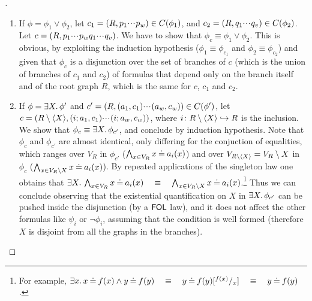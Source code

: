 \begin{proof}[]
\begin{enumerate}
\item 
If $\phi = \phi_1 \lor \phi_2$, let $c_1 = (R,p_1{\cdotp\mkern-2mu\cdotp\mkern-2mu\cdotp\mkern1mu} p_w) \in C({\phi_1})$, and $c_2 = (R,q_1{\cdotp\mkern-2mu\cdotp\mkern-2mu\cdotp\mkern1mu} q_v) \in C({\phi_2})$. Let $c = (R,p_1{\cdotp\mkern-2mu\cdotp\mkern-2mu\cdotp\mkern1mu} p_wq_1{\cdotp\mkern-2mu\cdotp\mkern-2mu\cdotp\mkern1mu} q_v)$. We have to show that $\phi_c \equiv \phi_1 \lor \phi_2$. This is obvious, by exploiting the induction hypothesis ($\phi_1 \equiv \phi_{c_1}$ and $\phi_2 \equiv \phi_{c_2}$) and given that $\phi_c$ is a disjunction over the set of branches of $c$ (which is the union of branches of $c_1$ and $c_2$) of formulas that depend only on the branch itself and of the root graph $R$, which is the same for $c$, $c_1$ and $c_2$.
\item 
If $\phi = \exists X .\, \phi'$ and $c' = (R,(a_1,c_1){\cdotp\mkern-2mu\cdotp\mkern-2mu\cdotp\mkern1mu} (a_w,c_w)) \in C({\phi'})$, let $c =  (R\setminus \langle X \rangle,(i;a_1,c_1){\cdotp\mkern-2mu\cdotp\mkern-2mu\cdotp\mkern1mu} (i;a_w,c_w))$, where $i\colon R\setminus \langle X \rangle \hookrightarrow R$ is the inclusion. We show that $\phi_c \equiv\exists X.\, \phi_{c'}$, and conclude by induction hypothesis. Note that $\phi_c$ and $\phi_{c'}$ are almost identical, only differing for the conjuction of equalities, which ranges over $V_R$ in $\phi_{c'}$ ($\bigwedge_{x\in V_R} x \mathbin{\doteq} a_i(x)$) and over $V_{R\setminus \langle X \rangle} = V_R \setminus X$ in $\phi_{c}$ ($\bigwedge_{x\in {V_R\setminus X}} x \mathbin{\doteq} a_i(x)$). By repeated applications of the singleton law one obtains that $\exists X.\, \bigwedge_{x\in V_R} x \mathbin{\doteq} a_i(x)\quad \equiv \quad \bigwedge_{x\in {V_R\setminus X}} x \mathbin{\doteq} a_i(x)$.\footnote{For example, $\exists x.\, x \mathbin{\doteq} f(x) \wedge y \mathbin{\doteq} f(y) \quad \equiv \quad  y \mathbin{\doteq} f(y)[^{f(x)}/_x] \quad \equiv \quad  y \mathbin{\doteq} f(y)$.}
Thus we can conclude observing that the existential quantification on $X$ in $\exists X.\, \phi_{c'}$ can be pushed inside the disjunction (by a $\mathsf{FOL}$ law), and it does not affect the other formulas like $\psi_i$ or $\neg \phi_i$, assuming that the condition is well formed (therefore $X$ is disjoint from all the graphs in the branches).  
\end{enumerate}
\end{proof}






